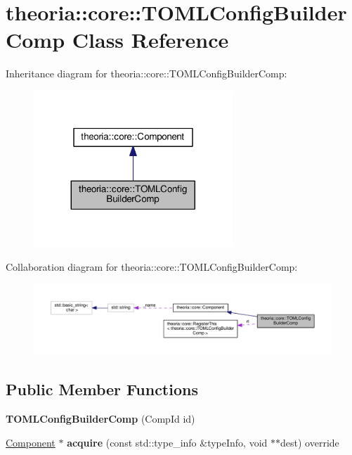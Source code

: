 \hypertarget{classtheoria_1_1core_1_1TOMLConfigBuilderComp}{}\section{theoria\+:\+:core\+:\+:T\+O\+M\+L\+Config\+Builder\+Comp Class Reference}
\label{classtheoria_1_1core_1_1TOMLConfigBuilderComp}


Inheritance diagram for theoria\+:\+:core\+:\+:T\+O\+M\+L\+Config\+Builder\+Comp\+:
\nopagebreak
\begin{figure}[H]
\begin{center}
\leavevmode
\includegraphics[width=212pt]{classtheoria_1_1core_1_1TOMLConfigBuilderComp__inherit__graph}
\end{center}
\end{figure}


Collaboration diagram for theoria\+:\+:core\+:\+:T\+O\+M\+L\+Config\+Builder\+Comp\+:
\nopagebreak
\begin{figure}[H]
\begin{center}
\leavevmode
\includegraphics[width=350pt]{classtheoria_1_1core_1_1TOMLConfigBuilderComp__coll__graph}
\end{center}
\end{figure}
\subsection*{Public Member Functions}
\begin{DoxyCompactItemize}
\item 
\mbox{\label{classtheoria_1_1core_1_1TOMLConfigBuilderComp_a7944116685d64329a987f6dd3f0f8f17}} 
{\bfseries T\+O\+M\+L\+Config\+Builder\+Comp} (Comp\+Id id)
\item 
\mbox{\label{classtheoria_1_1core_1_1TOMLConfigBuilderComp_a7cfce41f96c49af8e80d884f70ee66fa}} 
\hyperlink{classtheoria_1_1core_1_1Component}{Component} $\ast$ {\bfseries acquire} (const std\+::type\+\_\+info \&type\+Info, void $\ast$$\ast$dest) override
\end{DoxyCompactItemize}
